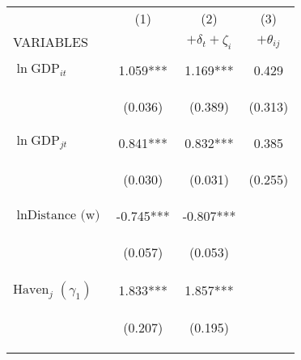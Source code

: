 \begin{center}
\begin{tabular}{lccc} \hline
 & (1) & (2) & (3) \\
VARIABLES &  & $+\delta_t+\zeta_i$ & $+\theta_{ij}$ \\ \hline
\vspace{4pt} & \begin{footnotesize}\end{footnotesize} & \begin{footnotesize}\end{footnotesize} & \begin{footnotesize}\end{footnotesize} \\
$\ln\text{GDP}_{it}$ & 1.059*** & 1.169*** & 0.429 \\
\vspace{4pt} & \begin{footnotesize}(0.036)\end{footnotesize} & \begin{footnotesize}(0.389)\end{footnotesize} & \begin{footnotesize}(0.313)\end{footnotesize} \\
$\ln\text{GDP}_{jt}$ & 0.841*** & 0.832*** & 0.385 \\
\vspace{4pt} & \begin{footnotesize}(0.030)\end{footnotesize} & \begin{footnotesize}(0.031)\end{footnotesize} & \begin{footnotesize}(0.255)\end{footnotesize} \\
$\ln\text{Distance (w)}$ & -0.745*** & -0.807*** &  \\
\vspace{4pt} & \begin{footnotesize}(0.057)\end{footnotesize} & \begin{footnotesize}(0.053)\end{footnotesize} & \begin{footnotesize}\end{footnotesize} \\
$\text{Haven}_j$ $(\gamma_1)$ & 1.833*** & 1.857*** &  \\
\vspace{4pt} & \begin{footnotesize}(0.207)\end{footnotesize} & \begin{footnotesize}(0.195)\end{footnotesize} & \begin{footnotesize}\end{footnotesize} \\

\end{tabular}
\end{center}
